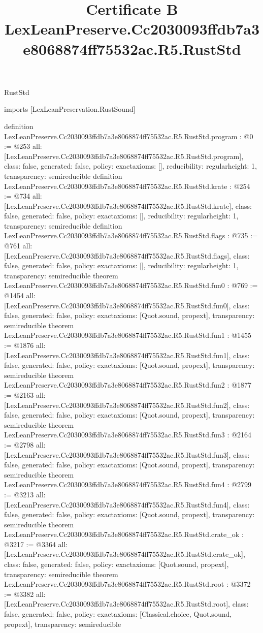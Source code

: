 \begin{lexlean}{RustStd}
\title{Certificate B LexLeanPreserve.Cc2030093ffdb7a3e8068874ff75532ac.R5.RustStd}
\begin{coremodule}
imports [LexLeanPreservation.RustSound]

definition LexLeanPreserve.Cc2030093ffdb7a3e8068874ff75532ac.R5.RustStd.program : @0 := @253 {
  all: [LexLeanPreserve.Cc2030093ffdb7a3e8068874ff75532ac.R5.RustStd.program],
  class: false,
  generated: false,
  policy: exact{axioms: []},
  reducibility: regular{height: 1},
  transparency: semireducible
}
definition LexLeanPreserve.Cc2030093ffdb7a3e8068874ff75532ac.R5.RustStd.krate : @254 := @734 {
  all: [LexLeanPreserve.Cc2030093ffdb7a3e8068874ff75532ac.R5.RustStd.krate],
  class: false,
  generated: false,
  policy: exact{axioms: []},
  reducibility: regular{height: 1},
  transparency: semireducible
}
definition LexLeanPreserve.Cc2030093ffdb7a3e8068874ff75532ac.R5.RustStd.flags : @735 := @761 {
  all: [LexLeanPreserve.Cc2030093ffdb7a3e8068874ff75532ac.R5.RustStd.flags],
  class: false,
  generated: false,
  policy: exact{axioms: []},
  reducibility: regular{height: 1},
  transparency: semireducible
}
theorem LexLeanPreserve.Cc2030093ffdb7a3e8068874ff75532ac.R5.RustStd.fun0 : @769 := @1454 {
  all: [LexLeanPreserve.Cc2030093ffdb7a3e8068874ff75532ac.R5.RustStd.fun0],
  class: false,
  generated: false,
  policy: exact{axioms: [Quot.sound, propext]},
  transparency: semireducible
}
theorem LexLeanPreserve.Cc2030093ffdb7a3e8068874ff75532ac.R5.RustStd.fun1 : @1455 := @1876 {
  all: [LexLeanPreserve.Cc2030093ffdb7a3e8068874ff75532ac.R5.RustStd.fun1],
  class: false,
  generated: false,
  policy: exact{axioms: [Quot.sound, propext]},
  transparency: semireducible
}
theorem LexLeanPreserve.Cc2030093ffdb7a3e8068874ff75532ac.R5.RustStd.fun2 : @1877 := @2163 {
  all: [LexLeanPreserve.Cc2030093ffdb7a3e8068874ff75532ac.R5.RustStd.fun2],
  class: false,
  generated: false,
  policy: exact{axioms: [Quot.sound, propext]},
  transparency: semireducible
}
theorem LexLeanPreserve.Cc2030093ffdb7a3e8068874ff75532ac.R5.RustStd.fun3 : @2164 := @2798 {
  all: [LexLeanPreserve.Cc2030093ffdb7a3e8068874ff75532ac.R5.RustStd.fun3],
  class: false,
  generated: false,
  policy: exact{axioms: [Quot.sound, propext]},
  transparency: semireducible
}
theorem LexLeanPreserve.Cc2030093ffdb7a3e8068874ff75532ac.R5.RustStd.fun4 : @2799 := @3213 {
  all: [LexLeanPreserve.Cc2030093ffdb7a3e8068874ff75532ac.R5.RustStd.fun4],
  class: false,
  generated: false,
  policy: exact{axioms: [Quot.sound, propext]},
  transparency: semireducible
}
theorem LexLeanPreserve.Cc2030093ffdb7a3e8068874ff75532ac.R5.RustStd.crate_ok : @3217 := @3364 {
  all: [LexLeanPreserve.Cc2030093ffdb7a3e8068874ff75532ac.R5.RustStd.crate_ok],
  class: false,
  generated: false,
  policy: exact{axioms: [Quot.sound, propext]},
  transparency: semireducible
}
theorem LexLeanPreserve.Cc2030093ffdb7a3e8068874ff75532ac.R5.RustStd.root : @3372 := @3382 {
  all: [LexLeanPreserve.Cc2030093ffdb7a3e8068874ff75532ac.R5.RustStd.root],
  class: false,
  generated: false,
  policy: exact{axioms: [Classical.choice, Quot.sound, propext]},
  transparency: semireducible
}


\end{coremodule}
\end{lexlean}
